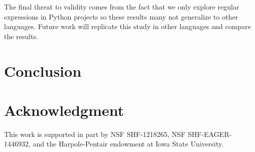 \documentclass[conference]{IEEEtran}
\begin{document}
The final threat to validity comes from the fact that we only explore regular expressions in Python projects so these results many not generalize to other languages. Future work will replicate this study in other languages and compare the results.


\section{Conclusion}
\label{sec:conclusion}



\section*{Acknowledgment}
This work is supported in part by NSF SHF-1218265, NSF SHF-EAGER-1446932, and the Harpole-Pentair endowment at Iowa State University.






\balance


\end{document}
